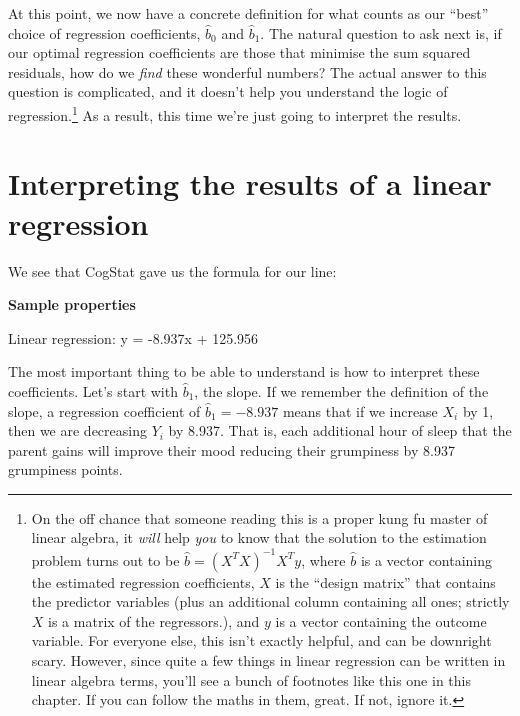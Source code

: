 \documentclass[
  11pt,
  a4paper,
  twoside,symmetric,openright]{book}
\theoremstyle{break}
\theoremstyle{break}
\begin{document}
At this point, we now have a concrete definition for what counts as our ``best'' choice of regression coefficients, \(\hat{b}_0\) and \(\hat{b}_1\). The natural question to ask next is, if our optimal regression coefficients are those that minimise the sum squared residuals, how do we \emph{find} these wonderful numbers? The actual answer to this question is complicated, and it doesn't help you understand the logic of regression.\footnote{On the off chance that someone reading this is a proper kung fu master of linear algebra, it \emph{will} help \emph{you} to know that the solution to the estimation problem turns out to be \(\hat{b} = (X^TX)^{-1} X^T y\), where \(\hat{b}\) is a vector containing the estimated regression coefficients, \(X\) is the ``design matrix'' that contains the predictor variables (plus an additional column containing all ones; strictly \(X\) is a matrix of the regressors.), and \(y\) is a vector containing the outcome variable. For everyone else, this isn't exactly helpful, and can be downright scary. However, since quite a few things in linear regression can be written in linear algebra terms, you'll see a bunch of footnotes like this one in this chapter. If you can follow the maths in them, great. If not, ignore it.} As a result, this time we're just going to interpret the results.

\section{Interpreting the results of a linear regression}\label{regressioninterpretation}

We see that CogStat gave us the formula for our line:

\begin{tcolorbox}[colback=white,
  colframe=lightgray,
  coltext=black,
  boxsep=4pt,
  boxrule=0.3pt,
  arc=0pt]
  {   \sffamily
      \color{CSbluelight}\textbf{Sample properties}
      
      \color{black}
      Linear regression: y = -8.937x + 125.956

      \normalfont
  }
\end{tcolorbox}

The most important thing to be able to understand is how to interpret these coefficients. Let's start with \(\hat{b}_1\), the slope. If we remember the definition of the slope, a regression coefficient of \(\hat{b}_1 = -8.937\) means that if we increase \(X_i\) by 1, then we are decreasing \(Y_i\) by 8.937. That is, each additional hour of sleep that the parent gains will improve their mood reducing their grumpiness by 8.937 grumpiness points.
\end{document}
